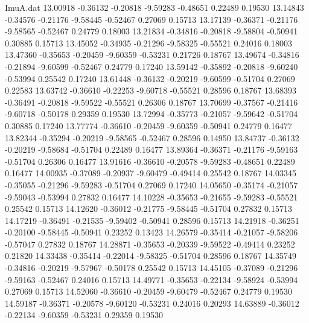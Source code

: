 \begin{filecontents}{ImuA.dat}
  13.00918   -0.36132   -0.20818   -9.59283   -0.48651    0.22489    0.19530
  13.14843   -0.34576   -0.21176   -9.58445   -0.52467    0.27069    0.15713
  13.17139   -0.36371   -0.21176   -9.58565   -0.52467    0.24779    0.18003
  13.21834   -0.34816   -0.20818   -9.58804   -0.50941    0.30885    0.15713
  13.45052   -0.34935   -0.21296   -9.58325   -0.55521    0.24016    0.18003
  13.47360   -0.35653   -0.20459   -9.60359   -0.53231    0.21726    0.18767
  13.49674   -0.34816   -0.21894   -9.60599   -0.52467    0.24779    0.17240
  13.59142   -0.35892   -0.20818   -9.60240   -0.53994    0.25542    0.17240
  13.61448   -0.36132   -0.20219   -9.60599   -0.51704    0.27069    0.22583
  13.63742   -0.36610   -0.22253   -9.60718   -0.55521    0.28596    0.18767
  13.68393   -0.36491   -0.20818   -9.59522   -0.55521    0.26306    0.18767
  13.70699   -0.37567   -0.21416   -9.60718   -0.50178    0.29359    0.19530
  13.72994   -0.35773   -0.21057   -9.59642   -0.51704    0.30885    0.17240
  13.77774   -0.36610   -0.20459   -9.60359   -0.50941    0.24779    0.16477
  13.82344   -0.35294   -0.20219   -9.58565   -0.52467    0.28596    0.14950
  13.84737   -0.36132   -0.20219   -9.58684   -0.51704    0.22489    0.16477
  13.89364   -0.36371   -0.21176   -9.59163   -0.51704    0.26306    0.16477
  13.91616   -0.36610   -0.20578   -9.59283   -0.48651    0.22489    0.16477
  14.00935   -0.37089   -0.20937   -9.60479   -0.49414    0.25542    0.18767
  14.03345   -0.35055   -0.21296   -9.59283   -0.51704    0.27069    0.17240
  14.05650   -0.35174   -0.21057   -9.59043   -0.53994    0.27832    0.16477
  14.10228   -0.35653   -0.21655   -9.59283   -0.55521    0.25542    0.15713
  14.12620   -0.36012   -0.21775   -9.58445   -0.51704    0.27832    0.15713
  14.17219   -0.36491   -0.21535   -9.59402   -0.50941    0.28596    0.15713
  14.21918   -0.36251   -0.20100   -9.58445   -0.50941    0.23252    0.13423
  14.26579   -0.35414   -0.21057   -9.58206   -0.57047    0.27832    0.18767
  14.28871   -0.35653   -0.20339   -9.59522   -0.49414    0.23252    0.21820
  14.33438   -0.35414   -0.22014   -9.58325   -0.51704    0.28596    0.18767
  14.35749   -0.34816   -0.20219   -9.57967   -0.50178    0.25542    0.15713
  14.45105   -0.37089   -0.21296   -9.59163   -0.52467    0.24016    0.15713
  14.49771   -0.35653   -0.22134   -9.58924   -0.53994    0.27069    0.15713
  14.52060   -0.36610   -0.20459   -9.60479   -0.52467    0.24779    0.19530
  14.59187   -0.36371   -0.20578   -9.60120   -0.53231    0.24016    0.20293
  14.63889   -0.36012   -0.22134   -9.60359   -0.53231    0.29359    0.19530

\end{filecontents}
